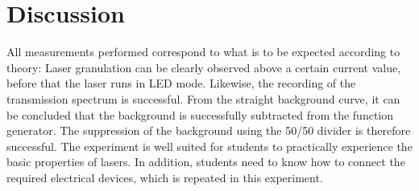 \section{Discussion}
\label{sec:Diskussion}

All measurements performed correspond to what is to be expected according to theory:
Laser granulation can be clearly observed above a certain current value, before that the laser runs in LED mode. Likewise, the recording of the transmission spectrum is successful. From the straight background curve, it can be concluded that the background is successfully subtracted from the function generator. The suppression of the background using the 50/50 divider is therefore successful. 
The experiment is well suited for students to practically experience the basic properties of lasers. In addition, students need to know how to connect the required electrical devices, which is repeated in this experiment.